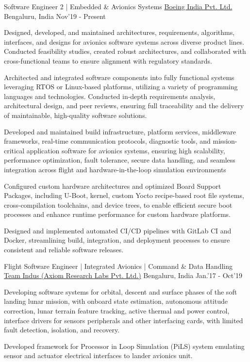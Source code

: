 \begin{cventries}
	\cventry
	{\large Software Engineer 2 | Embedded \& Avionics Systems}
	{\href{https://www.boeing.co.in/}{\large Boeing India Pvt. Ltd.}}
	{\large Bengaluru, India}
	{\large Nov'19 - Present}
	{
		\begin{cvitems}
		\item{\large Designed, developed, and maintained architectures, requirements, algorithms, interfaces, and designs for avionics software systems across diverse product lines. Conducted feasibility studies, created robust architectures, and collaborated with cross-functional teams to ensure alignment with regulatory standards.}
		\item{\large Architected and integrated software components into fully functional systems leveraging RTOS or Linux-based platforms, utilizing a variety of programming languages and technologies. Conducted in-depth requirements analysis, architectural design, and peer reviews, ensuring full traceability and the delivery of maintainable, high-quality software solutions.}
		\item{\large Developed and maintained build infrastructure, platform services, middleware frameworks, real-time communication protocols, diagnostic tools, and mission-critical application software for avionics systems, ensuring high scalability, performance optimization, fault tolerance, secure data handling, and seamless integration across flight and hardware-in-the-loop simulation environments}
		\item{\large Configured custom hardware architectures and optimized Board Support Packages, including U-Boot, kernel, custom Yocto recipe-based root file systems, cross-compilation toolchains, and device trees, to enable efficient secure boot processes and enhance runtime performance for custom hardware platforms.}
		\item{\large Designed and implemented automated CI/CD pipelines with GitLab CI and Docker, streamlining build, integration, and deployment processes to ensure consistent and reliable software releases.}
		\end{cvitems}
	}

	\cventry
	{\large Flight Software Engineer | Integrated Avionics | Command \& Data Handling}
	{\href{http://www.teamindus.in/}{\large Team Indus (Axiom Research Labs Pvt. Ltd.)}}
	{\large Bengaluru, India}
	{\large Jan.'17 - Oct'19}
	{
		\begin{cvitems}
		        \item{\large Developing software systems for orbital, descent and surface phases of the soft landing lunar mission, with onboard state estimation, autonomous attitude correction, lunar terrain feature tracking, active thermal and power control, interface drivers for sensors peripherals and other interfacing cards, with limited fault detection, isolation, and recovery.}
			\item{\large Developed framework for Processor in Loop Simulation (PiLS) system emulating sensor and actuator electrical interfaces to lander avionics unit.}
		\end{cvitems}
	}
\end{cventries}

